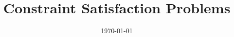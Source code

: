 \documentclass[10pt,twoside,a4paper,fleqn]{report}
\title{Constraint Satisfaction Problems}
\date{\today}
\begin{document}
\makeatletter
\let\UrlSpecialsOld\UrlSpecials
\def\UrlSpecials{\UrlSpecialsOld\do\/{\Url@slash}\do\_{\Url@underscore}}%
\def\Url@slash{\@ifnextchar/{\kern-.11em\mathchar47\kern-.2em}%
    {\kern-.0em\mathchar47\kern-.08em\penalty\UrlBigBreakPenalty}}
\def\Url@underscore{\nfss@text{\leavevmode \kern.06em\vbox{\hrule\@width.3em}}}
\makeatother

\maketitle              %




%


\pagestyle{fancy}                 %


\cleardoublepage
%
% 
% 

%





\end{document}
